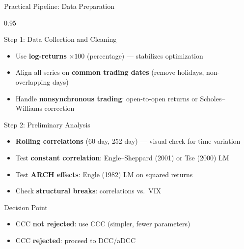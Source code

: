 \documentclass[9pt, aspectratio=169, t]{beamer}
\begin{document}
\begin{frame}{Practical Pipeline: Data Preparation}
    \begin{cminipage}{0.95\textwidth}
    {\scriptsize
    \begin{block}{Step 1: Data Collection and Cleaning}
        \begin{itemize}\setlength{\itemsep}{0pt}
            \item Use \textbf{log-returns} $\times 100$ (percentage) --- stabilizes optimization
            \item Align all series on \textbf{common trading dates} (remove holidays, non-overlapping days)
            \item Handle \textbf{nonsynchronous trading}: open-to-open returns or Scholes--Williams correction
        \end{itemize}
    \end{block}
    \vspace{-2mm}
    \begin{block}{Step 2: Preliminary Analysis}
        \begin{itemize}\setlength{\itemsep}{0pt}
            \item \textbf{Rolling correlations} (60-day, 252-day) --- visual check for time variation
            \item Test \textbf{constant correlation}: Engle--Sheppard (2001) or Tse (2000) LM
            \item Test \textbf{ARCH effects}: Engle (1982) LM on squared returns
            \item Check \textbf{structural breaks}: correlations vs.\ VIX
        \end{itemize}
    \end{block}
    \vspace{-1mm}
    \begin{alertblock}{Decision Point}
        \begin{itemize}\setlength{\itemsep}{0pt}
            \item CCC \textbf{not rejected}: use CCC (simpler, fewer parameters)
            \item CCC \textbf{rejected}: proceed to DCC/aDCC
        \end{itemize}
    \end{alertblock}
    }
    \end{cminipage}
\end{frame}
\end{document}
